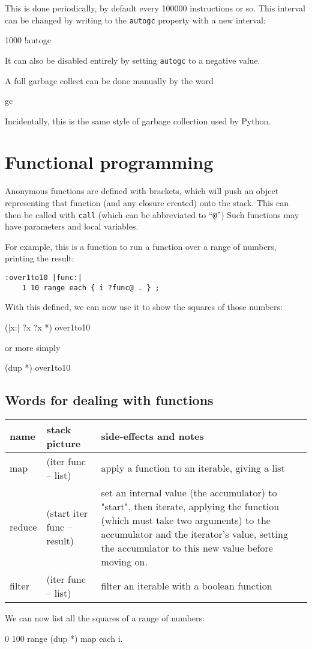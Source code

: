 This is done periodically, by default every 100000 instructions or so.
This interval can be changed by writing to the \verb+autogc+ property
with a new interval:
\begin{v}
1000 !autogc
\end{v}
It can also be disabled entirely by setting \texttt{autogc} to a negative
value.

A full garbage collect can be done manually by the word
\begin{v}
    gc
\end{v}
Incidentally, this is
the same style of garbage collection used by Python.



\section{Functional programming}
Anonymous functions are defined with brackets, which will push an object
representing that function (and any closure created) onto the stack. This can
then be called with \texttt{call}  (which can be abbreviated to ``\texttt{@}'')
Such functions may have parameters and local variables.

For example, this is a function to run a function over a range of numbers,
printing the result:

\begin{lstlisting}
:over1to10 |func:|
    1 10 range each { i ?func@ . } ;
\end{lstlisting}
With this defined, we can now use it to show the squares of those
numbers:        
\begin{v}
    (|x:| ?x ?x *) over1to10
\end{v}
or more simply
\begin{v}
    (dup *) over1to10
\end{v}

\subsection{Words for dealing with functions}
\begin{center}
\begin{tabular}{|l|l|p{4in}|}\hline
\textbf{name} & \textbf{stack picture} & \textbf{side-effects and notes}\\ \hline
map &(iter func -- list) & apply a function to an iterable, giving a list\\
reduce & (start iter func -- result) & set an internal value (the accumulator) to "start", then iterate, applying the function (which must take two arguments) to the accumulator and the iterator's value, setting the accumulator to this new value before moving on.\\
filter & (iter func -- list) & filter an iterable with a boolean function\\
\hline
\end{tabular}
\end{center}
We can now list all the squares of a range of numbers:
\begin{v}
0 100 range (dup *) map each {i.}
\end{v}


